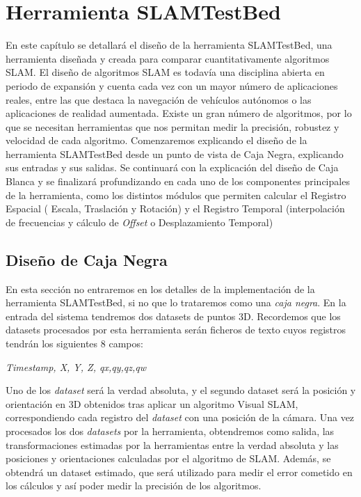 \newpage
\chapter{Herramienta SLAMTestBed} \label{cap:Herramienta SLAMTestBed} %
En este capítulo se detallará el diseño de la herramienta SLAMTestBed, una herramienta diseñada y creada para comparar cuantitativamente algoritmos SLAM. El diseño de algoritmos SLAM es todavía una disciplina abierta en periodo de expansión y cuenta cada vez con un mayor número de aplicaciones reales, entre las que destaca la navegación de vehículos autónomos o las aplicaciones de realidad aumentada. Existe un gran número de algoritmos, por lo que se necesitan herramientas que nos permitan medir la precisión, robustez y velocidad de cada algoritmo.
Comenzaremos explicando el diseño de la herramienta SLAMTestBed desde un punto de vista de Caja Negra, explicando sus entradas y sus salidas. Se continuará con la explicación del diseño de Caja Blanca y se finalizará profundizando en cada uno de los componentes principales de la herramienta, como los distintos módulos que permiten calcular el Registro Espacial ( Escala, Traslación y Rotación) y el Registro Temporal (interpolación de frecuencias y cálculo de \textit{Offset} o Desplazamiento Temporal)

\section{Diseño de Caja Negra}

En esta sección no entraremos en los detalles de la implementación de la herramienta SLAMTestBed, si no que lo trataremos como una \textit{caja negra}.
En la entrada del sistema tendremos dos datasets de puntos 3D.
Recordemos que los datasets procesados por esta herramienta serán ficheros de texto cuyos registros tendrán los siguientes 8 campos:

\textit{Timestamp, X, Y, Z, qx,qy,qz,qw}

Uno de los \textit{dataset} será la verdad absoluta, y el segundo dataset será la posición y orientación en 3D obtenidos tras aplicar un algoritmo Visual SLAM, correspondiendo cada registro del \textit{dataset} con una posición de la cámara.
Una vez procesados los dos \textit{datasets} por la herramienta, obtendremos como salida, las transformaciones estimadas por la herramientas entre la verdad absoluta y las posiciones y orientaciones calculadas por el algoritmo de SLAM. Además, se obtendrá un dataset estimado, que será utilizado para medir el error cometido en los cálculos y así poder medir la precisión de los algoritmos.


